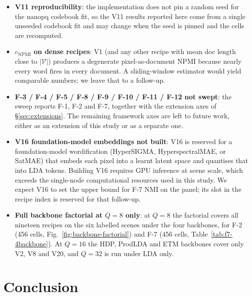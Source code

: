 \documentclass[journal,a4paper,10pt]{IEEEtran}
\begin{document}
\begin{itemize}
  \item \textbf{V11 reproducibility}: the implementation does not pin
    a random seed for the nanopq codebook fit, so the V11 results
    reported here come from a single unseeded codebook fit and may
    change when the seed is pinned and the cells are recomputed.
  \item \textbf{$c_{\mathrm{NPMI}}$ on dense recipes}: V1 (and any other recipe
    with mean doc length close to $|\mathcal{V}|$) produces a degenerate
    pixel-as-document NPMI because nearly every word fires in every document.
    A sliding-window estimator would yield comparable numbers; we
    leave that to a follow-up.
  \item \textbf{F-3 / F-4 / F-5 / F-8 / F-9 / F-10 / F-11 / F-12
    not swept}: the sweep reports F-1, F-2 and F-7, together with the
    extension axes of \S\ref{sec:extensions}. The remaining framework
    axes are left to future work, either as an extension of this
    study or as a separate one.
  \item \textbf{V16 foundation-model embeddings not built}: V16 is
    reserved for a foundation-model wordification (HyperSIGMA,
    HyperspectralMAE, or SatMAE) that embeds each pixel into a learnt
    latent space and quantises that into LDA tokens. Building V16
    requires GPU inference at scene scale, which exceeds the
    single-node computational resources used in this study. We expect
    V16 to set the upper bound for F-7 NMI on the panel; its slot in
    the recipe index is reserved for that follow-up.
  \item \textbf{Full backbone factorial at $Q = 8$ only}: at $Q = 8$ the
    factorial covers all nineteen recipes on the six labelled scenes
    under the four backbones, for F-2 (456 cells,
    Fig.~\ref{fig:backbone-factorial}) and F-7 (456 cells,
    Table~\ref{tab:f7-4backbone}). At $Q = 16$ the HDP, ProdLDA and
    ETM backbones cover only V2, V8 and V20, and $Q = 32$ is run under
    LDA only.
\end{itemize}

\section{Conclusion}\label{sec:conclusion}
\end{document}

